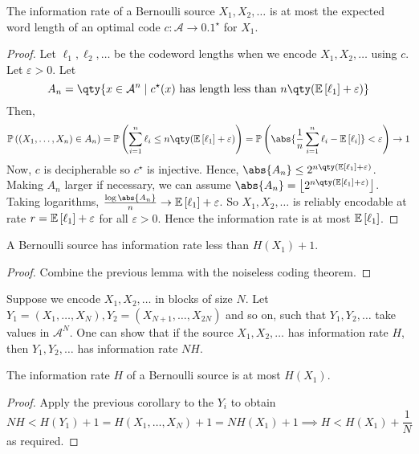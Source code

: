\begin{lemma}
    The information rate of a Bernoulli source $X_1, X_2, \dots$ is at most the expected word length of an optimal code $c \colon \mathcal A \to \qty{0,1}^\star$ for $X_1$.
\end{lemma}
\begin{proof}
    Let $\ell_1, \ell_2, \dots$ be the codeword lengths when we encode $X_1, X_2, \dots$ using $c$.
    Let $\varepsilon > 0$.
    Let
    \[ A_n = \qty{x \in \mathcal A^n \mid c^\star(x) \text{ has length less than } n \qty(\expect{\ell_1} + \varepsilon)} \]
    Then,
    \[ \prob{(X_1, \dots, X_n) \in A_n} = \prob{\sum_{i=1}^n \ell_i \leq n \qty(\expect{\ell_1} + \varepsilon)} = \prob{\abs{\frac{1}{n} \sum_{i=1}^n \ell_i - \expect{\ell_i}} < \varepsilon} \to 1 \]
    Now, $c$ is decipherable so $c^\star$ is injective.
    Hence, $\abs{A_n} \leq 2^{n\qty(\expect{\ell_1} + \varepsilon)}$.
    Making $A_n$ larger if necessary, we can assume $\abs{A_n} = \floor*{2^{n\qty(\expect{\ell_1} + \varepsilon)}}$.
    Taking logarithms, $\frac{\log \abs{A_n}}{n} \to \expect{\ell_1} + \varepsilon$.
    So $X_1, X_2, \dots$ is reliably encodable at rate $r = \mathbb{E}\left[{\ell_1}\right] + \varepsilon$ for all $\varepsilon > 0$.
    Hence the information rate is at most $\mathbb{E}\left[{\ell_1}\right]$.
\end{proof}
\begin{corollary}
    A Bernoulli source has information rate less than $H(X_1) + 1$.
\end{corollary}
\begin{proof}
    Combine the previous lemma with the noiseless coding theorem.
\end{proof}
Suppose we encode $X_1, X_2, \dots$ in blocks of size $N$.
Let $Y_1 = (X_1, \dots, X_N), Y_2 = (X_{N+1}, \dots, X_{2N})$ and so on, such that $Y_1, Y_2, \dots$ take values in $\mathcal A^N$.
One can show that if the source $X_1, X_2, \dots$ has information rate $H$, then $Y_1, Y_2, \dots$ has information rate $NH$.
\begin{proposition}
    The information rate $H$ of a Bernoulli source is at most $H(X_1)$.
\end{proposition}
\begin{proof}
    Apply the previous corollary to the $Y_i$ to obtain
    \[ NH < H(Y_1) + 1 = H(X_1, \dots, X_N) + 1 = NH(X_1) + 1 \implies H < H(X_1) + \frac{1}{N} \]
    as required.
\end{proof}

